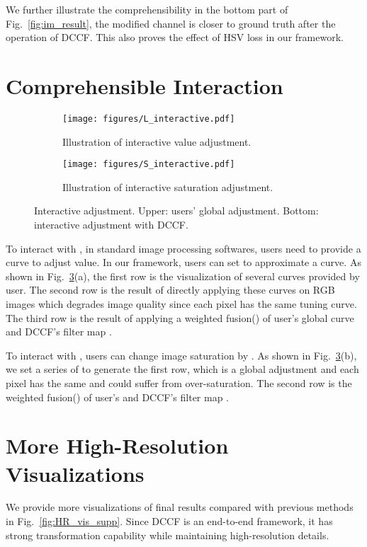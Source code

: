 \documentclass[runningheads]{llncs}
\begin{document}
We further illustrate the comprehensibility in the bottom part of Fig.~\ref{fig:im_result}, the modified channel is closer to ground truth after the operation of DCCF.
This also proves the effect of HSV loss in our framework.

\section{Comprehensible Interaction}
\label{interaction}

\begin{figure}[hthb]
\centering

\begin{subfigure}[t]{1\linewidth}\label{fig:edit_filter_L}
\texttt{[image: figures/L\_interactive.pdf]}
\caption{Illustration of interactive value adjustment. }
\end{subfigure}

\begin{subfigure}[t]{1\linewidth}\label{fig:edit_filter_S}
\texttt{[image: figures/S\_interactive.pdf]}
\caption{Illustration of interactive saturation adjustment. }
\end{subfigure}

\caption{Interactive adjustment.
Upper: users' global adjustment. Bottom: interactive adjustment with DCCF.
}
\label{fig:edit_filter_LS}
\vspace{-10pt}
\end{figure}

To interact with , in standard image processing softwares, users need to provide a curve to adjust value.
In our framework, users can set  to approximate a curve.
As shown in Fig.~\ref{fig:edit_filter_LS}(a), the first row is the visualization of several curves provided by user.
The second row is the result of directly applying these curves on RGB images which degrades image quality since each pixel has the same tuning curve.
The third row is the result of applying a weighted fusion() of user's global curve and DCCF's filter map .

To interact with , users can change image saturation by . 
As shown in Fig.~\ref{fig:edit_filter_LS}(b), we set a series of  to generate the first row, which is a global adjustment and each pixel has the same  and could suffer from over-saturation.
The second row is the weighted fusion() of user's  and DCCF's filter map .


\section{More High-Resolution Visualizations}
\label{sec:high-res-vis}
We provide more visualizations of final results compared with previous methods in Fig.~\ref{fig:HR_vis_supp}.
Since DCCF is an end-to-end framework, it has strong transformation capability while maintaining high-resolution details.
\end{document}
